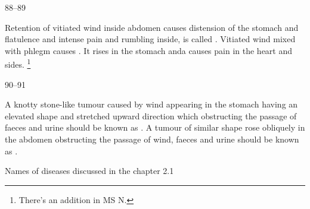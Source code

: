 \begin{translation}
\item[88--89]

	Retention of vitiated wind inside abdomen causes distension of the
	stomach and flatulence and intense pain and rumbling inside, is called
	. Vitiated wind mixed with phlegm causes
	. It rises in the stomach anda causes pain in the heart
	and sides. \footnote{There’s an addition in MS N. }

\item[90--91]

	A knotty stone-like tumour caused by wind appearing in the stomach
	having an elevated shape and stretched upward direction which
	obstructing the passage of faeces and urine should be known as
	. A tumour of similar shape rose obliquely in the abdomen
	obstructing the passage of wind, faeces and urine should be known as
	. 


	Names of diseases discussed in the chapter 2.1

	   
	 
	 
	   
	  




\end{translation}
